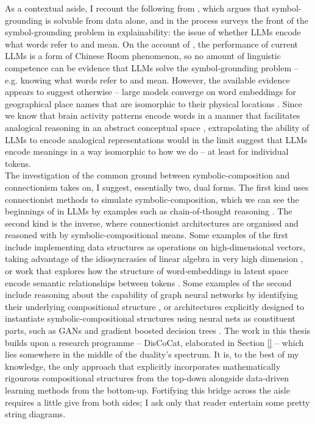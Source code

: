 \begin{fullwidth}
\begin{multicols}{2}
As a contextual aside, I recount the following from \citep{}, which argues that symbol-grounding is solvable from data alone, and in the process surveys the front of the symbol-grounding problem in explainability: the issue of whether LLMs encode what words refer to and mean. On the account of \citep{bender_climbing_2020}, the performance of current LLMs is a form of Chinese Room \citep{searle_minds_1980} phenomenon, so no amount of linguistic competence can be evidence that LLMs solve the symbol-grounding problem -- e.g. knowing what words refer to and mean. However, the available evidence appears to suggest otherwise -- large models converge on word embeddings for geographical place names that are isomorphic to their physical locations \citep{}. Since we know that brain activity patterns encode words in a manner that facilitates analogical reasoning in an abstract conceptual space \citep{}, extrapolating the ability of LLMs to encode analogical representations would in the limit suggest that LLMs encode meanings in a way isomorphic to how we do -- at least for individual tokens.\\

The investigation of the common ground between symbolic-composition and connectionism takes on, I suggest, essentially two, dual forms. The first kind uses connectionist methods to simulate symbolic-composition, which we can see the beginnings of in LLMs by examples such as chain-of-thought reasoning \cite{}. The second kind is the inverse, where connectionist architectures are organised and reasoned with by symbolic-compositional means. Some examples of the first include implementing data structures as operations on high-dimensional vectors, taking advantage of the idiosyncrasies of linear algebra in very high dimension \citep{}, or work that explores how the structure of word-embeddings in latent space encode semantic relationships between tokens \citep{}. Some examples of the second include reasoning about the capability of graph neural networks by identifying their underlying compositional structure \citep{}, or architectures explicitly designed to instantiate symbolic-compositional structures using neural nets as constituent parts, such as GANs \citep{} and gradient boosted decision trees \citep{}. The work in this thesis builds upon a research programme -- DisCoCat, elaborated in Section \ref{} -- which lies somewhere in the middle of the duality's spectrum. It is, to the best of my knowledge, the only approach that explicitly incorporates mathematically rigourous compositional structures from the top-down alongside data-driven learning methods from the bottom-up. Fortifying this bridge across the aisle requires a little give from both sides; I ask only that reader entertain some pretty string diagrams.


\end{multicols}
\end{fullwidth}
